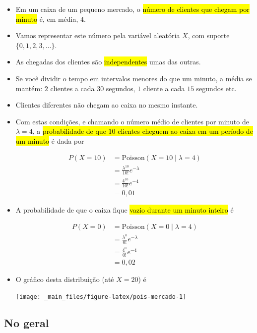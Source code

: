 \documentclass[
  11pt]{report}
\begin{document}
\begin{itemize}
\item
  Em um caixa de um pequeno mercado, o {\hl{número de clientes que chegam por minuto}} é, em média, $4$.
\item
  Vamos representar este número pela variável aleatória $X$, com suporte $\{ 0, 1, 2, 3, \ldots \}$.
\item
  As chegadas dos clientes são {\hl{independentes}} umas das outras.
\item
  Se você dividir o tempo em intervalos menores do que um minuto, a média se mantém: $2$ clientes a cada $30$ segundos, $1$ cliente a cada $15$ segundos etc.
\item
  Clientes diferentes não chegam ao caixa no mesmo instante.
\item
  Com estas condições, e chamando o número médio de clientes por minuto de $\lambda = 4$, a {\hl{probabilidade de que $10$ clientes cheguem ao caixa em um período de um minuto}} é dada por

  \[
  \begin{aligned}
  P(X = 10) &= \text{Poisson}(X = 10 \mid \lambda = 4) \\
            &= \frac{\lambda^{10}}{10!}e^{-\lambda} \\
            &= \frac{4^{10}}{10!}e^{-4} \\
            &= 0{,}01
  \end{aligned}
  \]
\item
  A probabilidade de que o caixa fique {\hl{vazio durante um minuto inteiro}} é

  \[
  \begin{aligned}
  P(X = 0) &= \text{Poisson}(X = 0 \mid \lambda = 4) \\
           &= \frac{\lambda^{0}}{0!}e^{-\lambda} \\
           &= \frac{4^{0}}{0!}e^{-4} \\
           &= 0{,}02
  \end{aligned}
  \]
\item
  O gráfico desta distribuição (até $X = 20$) é

  \begin{center}\texttt{[image: \_main\_files/figure-latex/pois-mercado-1]} \end{center}
\end{itemize}

\hypertarget{no-geral-5}{%
\subsection{No geral}\label{no-geral-5}}
\end{document}
